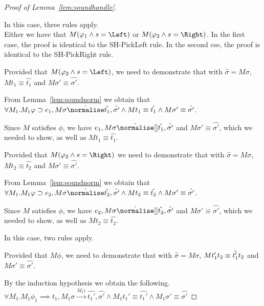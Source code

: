 \begin{proof}[Proof of Lemma~\ref{lem:soundhandle}]
{  }

  {
  In this case, three rules apply.\\
    {
    Either we have that $M(\phi_1\wedge s=\Left)$ or $M(\phi_2\wedge s=\Right)$.
    In the first case, the proof is identical to the SH-PickLeft rule.
    In the second cse, the proof is identical to the SH-PickRight rule.
    }

    {Provided that $M(\phi_2\wedge s=\Left)$, we need to demonstrate that  with $\hat{\sigma}=M\sigma$,
    $M t_1\equiv \hat{t_1}$ and $M\sigma'\equiv \hat{\sigma'}$.

    From Lemma~\ref{lem:soundnorm} we obtain that $\forall M_1. M_1 \phi \implies e_1,M\sigma\hat{\normalise}\hat{t_1},\hat{\sigma'}\land M t_1\equiv\hat{t_1}\land M \sigma'\equiv\hat{\sigma'}$.

    Since $M$ satisfies $\phi$, we have $e_1,M\sigma \hat{\normalise}[] \hat{t_1},\hat{\sigma'}$ and $M\sigma'\equiv\hat{\sigma'}$,
    which we needed to show, as well as $M t_1 \equiv \hat{t_1}$.

    }
    {Provided that $M(\phi_2\wedge s=\Right)$ we need to demonstrate that  with $\hat{\sigma}=M\sigma$,
    $M t_2\equiv \hat{t_2}$ and $M\sigma'\equiv \hat{\sigma'}$.

    From Lemma~\ref{lem:soundnorm} we obtain that $\forall M_1. M_1 \phi \implies e_2,M\sigma\hat{\normalise}\hat{t_2},\hat{\sigma'}\land M t_2\equiv\hat{t_2}\land M \sigma'\equiv\hat{\sigma'}$.

    Since $M$ satisfies $\phi$, we have $e_2,M\sigma \hat{\normalise}[] \hat{t_2},\hat{\sigma'}$ and $M\sigma'\equiv\hat{\sigma'}$,
    which we needed to show, as well as $M t_2 \equiv \hat{t_2}$.
    }
  }

  {
  In this case, two rules apply.\\
    {Provided that $M\phi$, we need to demonstrate that  with $\hat{\sigma}=M\sigma$,
    $M t_1'\relax t_2\equiv \hat{t_1'}\relax t_2$ and $M\sigma'\equiv \hat{\sigma'}$.

    By the induction hypothesis we obtain the following.\\
    $\forall M_1 . M_1 \phi_1 \implies t_1,M_1\sigma \xrightarrow[]{M_1 i} \hat{t_1'},\hat{\sigma'}\land M_1 t_1'\equiv\hat{t_1'}\land M_1\sigma' \equiv \hat{\sigma'}$

}}
\end{proof}
